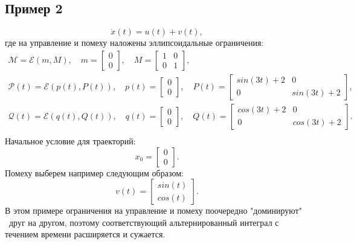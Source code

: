 \subsection{Пример 2}
\begin{equation*}
    \dot{x}(t) = u(t) + v(t),
\end{equation*}
где на управление и помеху наложены эллипсоидальные ограничения:
\begin{gather*}
    \mathcal{M} = \mathcal{E}(m, M), \quad
    m = \begin{bmatrix}
        0 \\[0.3em]
        0
    \end{bmatrix}, \quad
    M = \begin{bmatrix}
        1 & 0 \\[0.3em]
        0 & 1
    \end{bmatrix}, \\
    \mathcal{P}(t) = \mathcal{E}(p(t), P(t)), \quad
    p(t) = \begin{bmatrix}
        0 \\[0.3em]
        0
    \end{bmatrix}, \quad
    P(t) = \begin{bmatrix}
        sin(3t) + 2 & 0 \\[0.3em]
        0 & sin(3t) + 2
    \end{bmatrix}, \\
    \mathcal{Q}(t) = \mathcal{E}(q(t), Q(t)), \quad
    q(t) = \begin{bmatrix}
        0 \\[0.3em]
        0
    \end{bmatrix}, \quad
    Q(t) = \begin{bmatrix}
        cos(3t) + 2 & 0 \\[0.3em]
        0 & cos(3t) + 2
    \end{bmatrix}. \\
\end{gather*}
Начальное условие для траекторий:
\begin{equation*}
    x_0 = \begin{bmatrix}
        0 \\[0.3em]
        0
    \end{bmatrix}.
\end{equation*}
Помеху выберем например следующим образом:
\begin{equation*}
    v(t) = \begin{bmatrix}
        sin(t) \\[0.3em]
        cos(t)
    \end{bmatrix}.
\end{equation*}
В этом примере ограничения на управление и помеху поочередно "доминируют" \ друг на другом, поэтому соответствующий альтернированный интеграл
 с течением времени расширяется и сужается.

